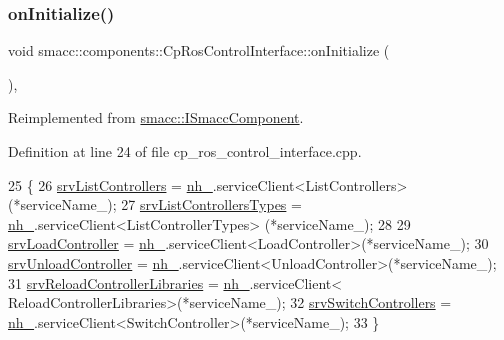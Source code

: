 \subsubsection{\texorpdfstring{on\+Initialize()}{onInitialize()}}
{\footnotesize\ttfamily void smacc\+::components\+::\+Cp\+Ros\+Control\+Interface\+::on\+Initialize (\begin{DoxyParamCaption}{ }\end{DoxyParamCaption})\hspace{0.3cm}{\ttfamily [override]}, {\ttfamily [virtual]}}



Reimplemented from \hyperlink{classsmacc_1_1ISmaccComponent_ae6f71d008db12553912e9436184b9e65}{smacc\+::\+I\+Smacc\+Component}.



Definition at line 24 of file cp\+\_\+ros\+\_\+control\+\_\+interface.\+cpp.


\begin{DoxyCode}
25 \{
26     \hyperlink{classsmacc_1_1components_1_1CpRosControlInterface_aec2d2eb63ad4f04741493329e6c33696}{srvListControllers} = \hyperlink{classsmacc_1_1components_1_1CpRosControlInterface_a58b15bd11d13cb02813232c6e50adbd2}{nh\_}.serviceClient<ListControllers>(*serviceName\_);
27     \hyperlink{classsmacc_1_1components_1_1CpRosControlInterface_a5a4983fca48da646b5fc94ce1f0e4114}{srvListControllersTypes} = \hyperlink{classsmacc_1_1components_1_1CpRosControlInterface_a58b15bd11d13cb02813232c6e50adbd2}{nh\_}.serviceClient<ListControllerTypes>
      (*serviceName\_);
28 
29     \hyperlink{classsmacc_1_1components_1_1CpRosControlInterface_aa6c1440534d6a825644f0c3620461b72}{srvLoadController} = \hyperlink{classsmacc_1_1components_1_1CpRosControlInterface_a58b15bd11d13cb02813232c6e50adbd2}{nh\_}.serviceClient<LoadController>(*serviceName\_);
30     \hyperlink{classsmacc_1_1components_1_1CpRosControlInterface_a0515a2a86bfcd0fdec08fabd3070723c}{srvUnloadController} = \hyperlink{classsmacc_1_1components_1_1CpRosControlInterface_a58b15bd11d13cb02813232c6e50adbd2}{nh\_}.serviceClient<UnloadController>(*serviceName\_);
31     \hyperlink{classsmacc_1_1components_1_1CpRosControlInterface_afdfece75d6aa438fae728e72add50e16}{srvReloadControllerLibraries} = \hyperlink{classsmacc_1_1components_1_1CpRosControlInterface_a58b15bd11d13cb02813232c6e50adbd2}{nh\_}.serviceClient<
      ReloadControllerLibraries>(*serviceName\_);
32     \hyperlink{classsmacc_1_1components_1_1CpRosControlInterface_a78e45e68567c23ca5c19df0de257c20f}{srvSwitchControllers} = \hyperlink{classsmacc_1_1components_1_1CpRosControlInterface_a58b15bd11d13cb02813232c6e50adbd2}{nh\_}.serviceClient<SwitchController>(*serviceName\_);
33 \}
\end{DoxyCode}
\mbox{\label{classsmacc_1_1components_1_1CpRosControlInterface_acd3534897ecf6b28ee3804dcbefedae9}} 
